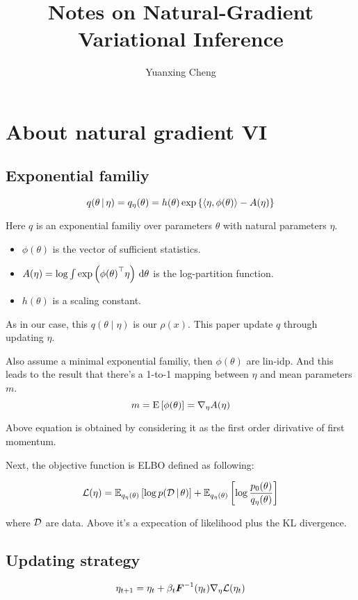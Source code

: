 \documentclass{article}
\title{Notes on Natural-Gradient Variational Inference}
\author{Yuanxing Cheng}
\begin{document}
\maketitle

\section{About natural gradient VI}
\subsection{Exponential familiy}
\begin{equation}
    q(\theta\,|\,\eta)=q_\eta(\theta)=h(\theta) \exp\left\{ \left \langle \eta,\phi(\theta) \right \rangle-A(\eta) \right\}
\end{equation}

Here \(q\) is an exponential familiy over parameters \(\theta\) with natural parameters \(\eta\). 

\begin{itemize}
    \item \(\phi(\theta)\) is the vector of sufficient statistics.
    \item \(A(\eta)=\log \int\exp\left( {\phi(\theta)}^\top\eta \right)\,\mathrm{d} \theta \) is the log-partition function.
    \item \(h(\theta)\) is a scaling constant. 
\end{itemize}

As in our case, this \(q(\theta\mid\eta)\) is our \(\rho(x)\). This paper update \(q\) through updating \(\eta\).

Also assume a minimal exponential familiy, then \(\phi(\theta)\) are lin-idp. And this leads to the result that there's a 1-to-1 mapping between \(\eta\) and mean parameters \(m\).
\[m=\mathrm{E}\left[ \phi(\theta) \right]=\nabla_\eta A(\eta)\]

Above equation is obtained by considering it as the first order dirivative of first momentum. 

Next, the objective function is ELBO defined as following:

\begin{equation}
    \mathcal{L}(\eta)=\mathbb{E}_{q_\eta(\theta)}\left[ \log p(\mathcal{D}\,|\,\theta) \right]+\mathbb{E}_{q_\eta(\theta)}\left[ \log\frac{p_0(\theta)}{q_\eta(\theta)} \right]
\end{equation}

where \(\mathcal{D}\) are data. Above it's a expecation of likelihood plus the KL divergence.

\subsection{Updating strategy}
\begin{equation}\label{eq:updateEta}
    \eta_{t+1}=\eta_t+\beta_t\boldsymbol{F}^{-1}(\eta_t)\nabla_\eta \mathcal{L}(\eta_t)
\end{equation}
\end{document}

